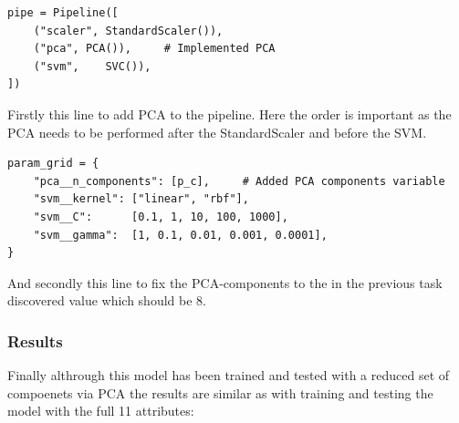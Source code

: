\begin{verbatim}
pipe = Pipeline([
    ("scaler", StandardScaler()),
    ("pca", PCA()),     # Implemented PCA
    ("svm",    SVC()),
])
\end{verbatim}
Firstly this line to add PCA to the pipeline. Here the order is important as the PCA needs to be performed after the StandardScaler and before the SVM.

\begin{verbatim}
param_grid = {
    "pca__n_components": [p_c],     # Added PCA components variable
    "svm__kernel": ["linear", "rbf"],
    "svm__C":      [0.1, 1, 10, 100, 1000],
    "svm__gamma":  [1, 0.1, 0.01, 0.001, 0.0001],
}
\end{verbatim}
And secondly this line to fix the PCA-components to the in the previous task discovered value which should be 8.

\subsubsection{Results}

Finally althrough this model has been trained and tested with a reduced set of compoenets via PCA the results are similar as with training and testing the model with the full 11 attributes:


